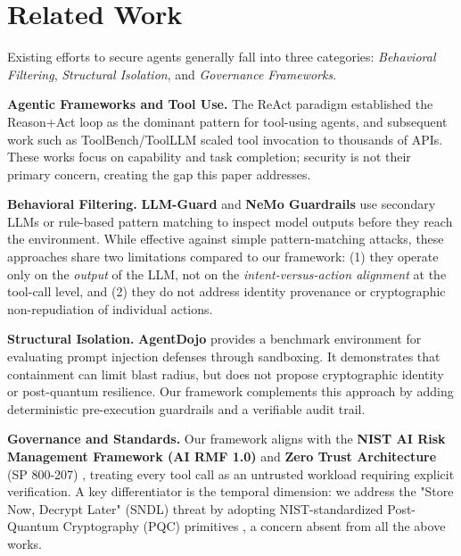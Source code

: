 \documentclass[conference]{IEEEtran}
\begin{document}
\section{Related Work}
Existing efforts to secure agents generally fall into three categories: \textit{Behavioral Filtering}, \textit{Structural Isolation}, and \textit{Governance Frameworks}.

\textbf{Agentic Frameworks and Tool Use.} The ReAct paradigm \cite{yao2023react} established the Reason+Act loop as the dominant pattern for tool-using agents, and subsequent work such as ToolBench/ToolLLM \cite{qin2023toolllm} scaled tool invocation to thousands of APIs. These works focus on capability and task completion; security is not their primary concern, creating the gap this paper addresses.

\textbf{Behavioral Filtering.} \textbf{LLM-Guard} \cite{llmguard2023} and \textbf{NeMo Guardrails} \cite{nemoguardrails2023} use secondary LLMs or rule-based pattern matching to inspect model outputs before they reach the environment. While effective against simple pattern-matching attacks, these approaches share two limitations compared to our framework: (1) they operate only on the \textit{output} of the LLM, not on the \textit{intent-versus-action alignment} at the tool-call level, and (2) they do not address identity provenance or cryptographic non-repudiation of individual actions.

\textbf{Structural Isolation.} \textbf{AgentDojo} \cite{agentdojo2024} provides a benchmark environment for evaluating prompt injection defenses through sandboxing. It demonstrates that containment can limit blast radius, but does not propose cryptographic identity or post-quantum resilience. Our framework complements this approach by adding deterministic pre-execution guardrails and a verifiable audit trail.

\textbf{Governance and Standards.} Our framework aligns with the \textbf{NIST AI Risk Management Framework (AI RMF 1.0)} \cite{nistairmf2023} and \textbf{Zero Trust Architecture} (SP 800-207) \cite{nist2020zt}, treating every tool call as an untrusted workload requiring explicit verification. A key differentiator is the temporal dimension: we address the "Store Now, Decrypt Later" (SNDL) threat by adopting NIST-standardized Post-Quantum Cryptography (PQC) primitives \cite{nistfips203, nistfips204}, a concern absent from all the above works.
\end{document}
